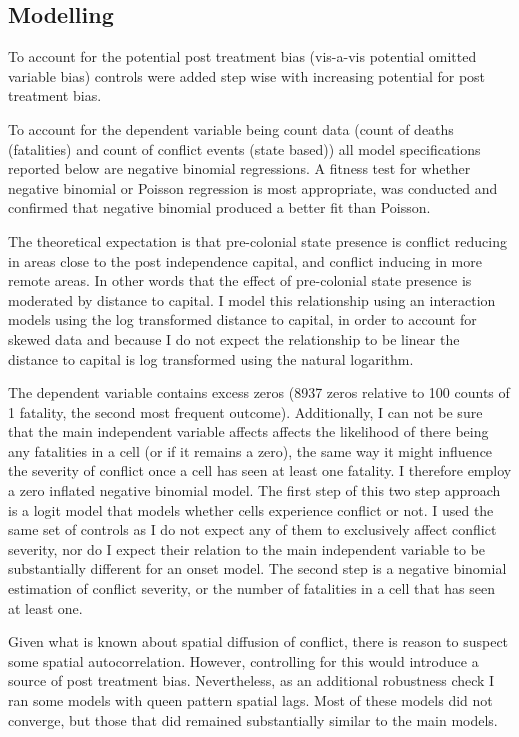 \documentclass[12pt]{article}
\begin{document}
\subsection{Modelling}

To account for the potential post treatment bias (vis-a-vis potential omitted
variable bias) controls were added step wise with increasing potential for post
treatment bias.

To account for the dependent variable being count data (count of deaths
(fatalities) and count of conflict events (state based)) all model
specifications reported below are negative binomial regressions. A fitness test
for whether negative binomial or Poisson regression is most appropriate, was
conducted and confirmed that negative binomial produced a better fit than
Poisson.

The theoretical expectation is that pre-colonial state presence is conflict
reducing in areas close to the post independence capital, and conflict inducing
in more remote areas. In other words that the effect of pre-colonial state
presence is moderated by distance to capital. I model this relationship using an
interaction models using the log transformed distance to capital, in order to
account for skewed data and because I do not expect the relationship to be
linear the distance to capital is log transformed using the natural logarithm.

The dependent variable contains excess zeros (8937 zeros relative to 100 counts
of 1 fatality, the second most frequent outcome). Additionally, I can not be
sure that the main independent variable affects affects the likelihood of there
being any fatalities in a cell (or if it remains a zero), the same way it might
influence the severity of conflict once a cell has seen at least one fatality. I
therefore employ a zero inflated negative binomial model. The first step of this
two step approach is a logit model that models whether cells experience conflict
or not. I used the same set of controls as I do not expect any of them to
exclusively affect conflict severity, nor do I expect their relation to the main
independent variable to be substantially different for an onset model. The
second step is a negative binomial estimation of conflict severity, or the
number of fatalities in a cell that has seen at least one.

Given what is known about spatial diffusion of conflict, there is reason to
suspect some spatial autocorrelation. However, controlling for this would
introduce a source of post treatment bias. Nevertheless, as an additional
robustness check I ran some models with queen pattern spatial lags. Most of
these models did not converge, but those that did remained substantially similar
to the main models.
\end{document}

